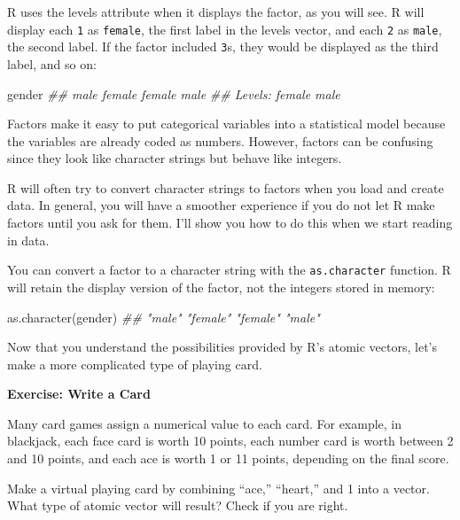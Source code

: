 \documentclass[
  letterpaper,
  DIV=11,
  numbers=noendperiod]{scrbook}
\newenvironment{Shaded}{\begin{snugshade}}{\end{snugshade}}
\newcommand{\DocumentationTok}[1]{\textcolor[rgb]{0.37,0.37,0.37}{\textit{#1}}}
\newcommand{\FunctionTok}[1]{\textcolor[rgb]{0.28,0.35,0.67}{#1}}
\newcommand{\NormalTok}[1]{\textcolor[rgb]{0.00,0.23,0.31}{#1}}
\begin{document}
R uses the levels attribute when it displays the factor, as you will
see. R will display each \texttt{1} as \texttt{female}, the first label
in the levels vector, and each \texttt{2} as \texttt{male}, the second
label. If the factor included \texttt{3}s, they would be displayed as
the third label, and so on:

\begin{Shaded}
\begin{Highlighting}[]
\NormalTok{gender}
\DocumentationTok{\#\# male   female female male  }
\DocumentationTok{\#\# Levels: female male}
\end{Highlighting}
\end{Shaded}

Factors make it easy to put categorical variables into a statistical
model because the variables are already coded as numbers. However,
factors can be confusing since they look like character strings but
behave like integers.

R will often try to convert character strings to factors when you load
and create data. In general, you will have a smoother experience if you
do not let R make factors until you ask for them. I'll show you how to
do this when we start reading in data.

You can convert a factor to a character string with the
\texttt{as.character} function. R will retain the display version of the
factor, not the integers stored in memory:

\begin{Shaded}
\begin{Highlighting}[]
\FunctionTok{as.character}\NormalTok{(gender)}
\DocumentationTok{\#\# "male"   "female" "female" "male"}
\end{Highlighting}
\end{Shaded}

Now that you understand the possibilities provided by R's atomic
vectors, let's make a more complicated type of playing card.

\begin{tcolorbox}[enhanced jigsaw, left=2mm, breakable, colback=white, colframe=quarto-callout-color-frame, leftrule=.75mm, bottomrule=.15mm, arc=.35mm, opacityback=0, rightrule=.15mm, toprule=.15mm]

\vspace{-3mm}\textbf{Exercise: Write a Card}\vspace{3mm}

Many card games assign a numerical value to each card. For example, in
blackjack, each face card is worth 10 points, each number card is worth
between 2 and 10 points, and each ace is worth 1 or 11 points, depending
on the final score.

Make a virtual playing card by combining ``ace,'' ``heart,'' and 1 into
a vector. What type of atomic vector will result? Check if you are
right.

\end{tcolorbox}
\end{document}
